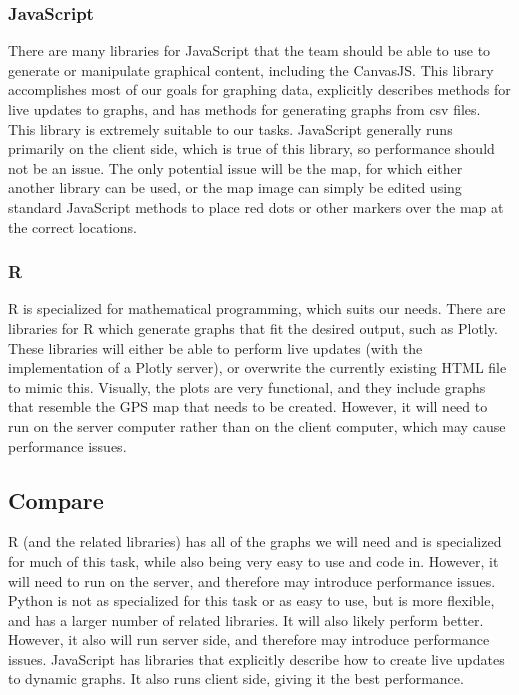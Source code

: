 \documentclass[onecolumn, draftclsnofoot,10pt, compsoc]{IEEEtran}
\begin{document}
\subsubsection{JavaScript}
There are many libraries for JavaScript that the team should be able to use to generate or manipulate graphical content, including the CanvasJS\cite{site2}. This library accomplishes most of our goals for graphing data, explicitly describes methods for live updates to graphs, and has methods for generating graphs from csv files. This library is extremely suitable to our tasks. JavaScript generally runs primarily on the client side, which is true of this library, so performance should not be an issue. The only potential issue will be the map, for which either another library can be used, or the map image can simply be edited using standard JavaScript methods to place red dots or other markers over the map at the correct locations.

\subsubsection{R}
R is specialized for mathematical programming, which suits our needs. There are libraries for R which generate graphs that fit the desired output, such as Plotly\cite{site3}. These libraries will either be able to perform live updates (with the implementation of a Plotly server), or overwrite the currently existing HTML file to mimic this. Visually, the plots are very functional, and they include graphs that resemble the GPS map that needs to be created. However, it will need to run on the server computer rather than on the client computer, which may cause performance issues.

\subsection{Compare}
R (and the related libraries) has all of the graphs we will need and is specialized for much of this task, while also being very easy to use and code in. However, it will need to run on the server, and therefore may introduce performance issues. Python is not as specialized for this task or as easy to use, but is more flexible, and has a larger number of related libraries. It will also likely perform better. However, it also will run server side, and therefore may introduce performance issues. JavaScript has libraries that explicitly describe how to create live updates to dynamic graphs. It also runs client side, giving it the best performance.
\end{document}
